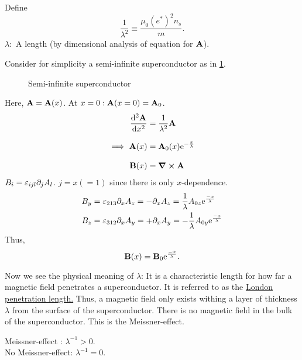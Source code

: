 Define 
\begin{equation} 
\frac{1}{\lambda^2} \equiv \frac{\mu_0\left( e^* \right)^2n_s}{m}.
\end{equation}
$\lambda:$ A length (by dimensional analysis of equation for $\vb A$).

Consider for simplicity a semi-infinite superconductor as in \cref{fig:semi_infinite_superconductor}.
\begin{figure}
	\centering
{}
\caption{Semi-infinite superconductor}
\label{fig:semi_infinite_superconductor}
\end{figure}
Here, $\vb A = \vb A(x)$. At $x=0: \vb A(x=0) = \vb A_0$.
\begin{align} 
\dv[2]{\vb A}{x} &= \dfrac{1}{\lambda^2}\vb A  \\[2ex]
\implies \vb A(x) &= \vb A_0(x)\mathrm{e}^{-\frac{x}{\lambda}} \\[2ex]
\vb B(x) &= \curl{\vb A}
\end{align}
$B_i = \varepsilon_{ijl}\partial_j A_l$. $j = x(=1)$ since there is only $x$-dependence. 
\begin{align*} 
B_y &= \varepsilon_{213}\partial_x A_z =-\partial_xA_z = \frac1\lambda A_{0z}\mathrm{e}^{\frac{-x}{\lambda}} \\
B_z &= \varepsilon_{312}\partial_x A_y =+\partial_xA_y = - \frac1\lambda A_{0y}\mathrm{e}^{\frac{-x}{\lambda}}
\end{align*}
Thus, 
\begin{equation} 
\vb B(x) = \vb B_0\mathrm{e}^{\frac{-x}{\lambda}}.
\end{equation}

\begin{figure}
	\centering
	
\end{figure}
Now we see the physical meaning of $\lambda$: It is a characteristic length for how far a magnetic field penetrates a superconductor. It is referred to as the \underline{London penetration length.}
Thus, a magnetic field only exists withing a layer of thickness $\lambda$ from the surface of the superconductor. There is no magnetic field in the bulk of the superconductor. This is the Meissner-effect.
\begin{tcolorbox}[center, width = 0.5\textwidth]
	\centering
	Meissner-effect : $\lambda^{-1} >0$. \\[2ex]
	No Meissner-effect: $\lambda^{-1} = 0$. 
\end{tcolorbox}

